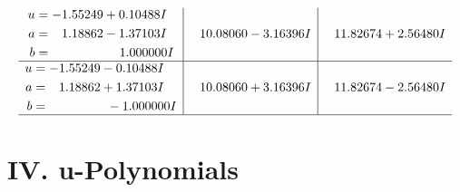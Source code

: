 \documentclass[1p]{elsarticle_modified}
\theoremstyle{definition}
\begin{document}
$$\begin{array}{c|c|c}
\begin{aligned}
u &= -1.55249 + 0.10488 I \\
a &= \phantom{-}1.18862 - 1.37103 I \\
b &= \phantom{-0.000000 -}1.000000 I\end{aligned}
 & \phantom{-}10.08060 - 3.16396 I & \phantom{-}11.82674 + 2.56480 I \\ \hline\begin{aligned}
u &= -1.55249 - 0.10488 I \\
a &= \phantom{-}1.18862 + 1.37103 I \\
b &= \phantom{-0.000000 } -1.000000 I\end{aligned}
 & \phantom{-}10.08060 + 3.16396 I & \phantom{-}11.82674 - 2.56480 I\\
 \hline 
 \end{array}$$\newpage
\newpage\renewcommand{\arraystretch}{1}
\centering \section*{ IV. u-Polynomials}
\end{document}
